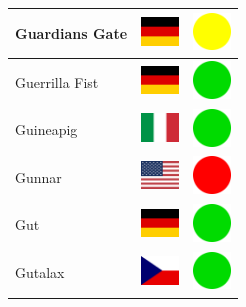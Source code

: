 \documentclass[12pt, a4paper, twoside]{report}
\begin{document}
\begin{center}
\begin{longtable}{|p{5cm}|p{2cm}|p{2cm}|}
 Guardians Gate                                             & \includegraphics[width=1cm]{../img/flags/de} &   \includegraphics[width=1cm]{../likes/m} \\ \hline
 Guerrilla Fist                                             & \includegraphics[width=1cm]{../img/flags/de} &   \includegraphics[width=1cm]{../likes/y} \\ \hline
 Guineapig                                                  & \includegraphics[width=1cm]{../img/flags/it} &   \includegraphics[width=1cm]{../likes/y} \\ \hline
 Gunnar                                                     & \includegraphics[width=1cm]{../img/flags/us} &   \includegraphics[width=1cm]{../likes/n} \\ \hline
 Gut                                                        & \includegraphics[width=1cm]{../img/flags/de} &   \includegraphics[width=1cm]{../likes/y} \\ \hline
 Gutalax                                                    & \includegraphics[width=1cm]{../img/flags/cz} &   \includegraphics[width=1cm]{../likes/y} \\ \hline

\end{longtable}
\end{center}
\end{document}
